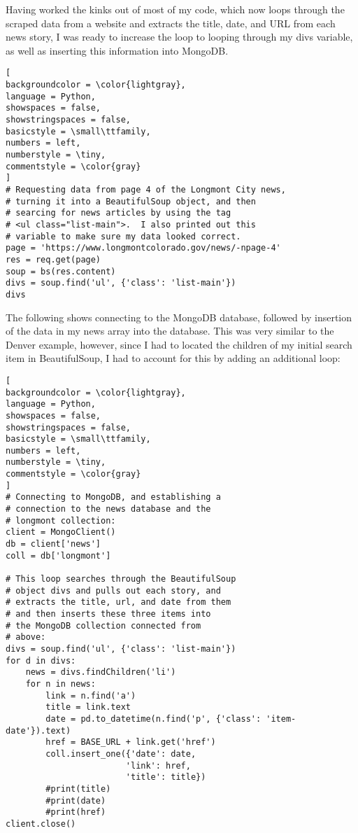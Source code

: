 \documentclass[]{article}
\begin{document}
Having worked the kinks out of most of my code, which now loops through the scraped data from a website and extracts the title, date, and URL from each news story, I was ready to increase the loop to looping through my divs variable, as well as inserting this information into MongoDB.  
\begin{lstlisting}[
backgroundcolor = \color{lightgray},
language = Python,
showspaces = false,
showstringspaces = false,
basicstyle = \small\ttfamily,
numbers = left,
numberstyle = \tiny,
commentstyle = \color{gray}
]
# Requesting data from page 4 of the Longmont City news,
# turning it into a BeautifulSoup object, and then
# searcing for news articles by using the tag
# <ul class="list-main">.  I also printed out this
# variable to make sure my data looked correct. 
page = 'https://www.longmontcolorado.gov/news/-npage-4'
res = req.get(page)
soup = bs(res.content)
divs = soup.find('ul', {'class': 'list-main'})
divs

\end{lstlisting}
The following shows connecting to the MongoDB database, followed by insertion of the data in my news array into the database.  This was very similar to the Denver example, however, since I had to located the children of my initial search item in BeautifulSoup, I had to account for this by adding an additional loop:
\begin{lstlisting}[
backgroundcolor = \color{lightgray},
language = Python,
showspaces = false,
showstringspaces = false,
basicstyle = \small\ttfamily,
numbers = left,
numberstyle = \tiny,
commentstyle = \color{gray}
]
# Connecting to MongoDB, and establishing a 
# connection to the news database and the
# longmont collection:
client = MongoClient()
db = client['news']
coll = db['longmont']

# This loop searches through the BeautifulSoup
# object divs and pulls out each story, and
# extracts the title, url, and date from them
# and then inserts these three items into
# the MongoDB collection connected from
# above:
divs = soup.find('ul', {'class': 'list-main'})
for d in divs:
	news = divs.findChildren('li')
	for n in news:
		link = n.find('a')
		title = link.text
		date = pd.to_datetime(n.find('p', {'class': 'item-date'}).text)
		href = BASE_URL + link.get('href')
		coll.insert_one({'date': date,
						'link': href,
						'title': title})
		#print(title)
		#print(date)
		#print(href)
client.close()

\end{lstlisting}
\end{document}
